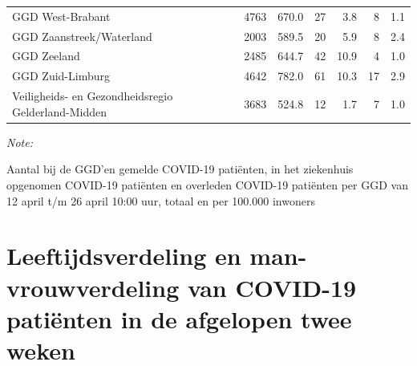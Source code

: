 \documentclass[
  english,
  man,floatsintext]{apa6}
\begin{document}
\begin{table}
\begin{threeparttable}
\begin{tabular}{lrrrrrr}
GGD West-Brabant & 4763 & 670.0 & 27 & 3.8 & 8 & 1.1\\
GGD Zaanstreek/Waterland & 2003 & 589.5 & 20 & 5.9 & 8 & 2.4\\
GGD Zeeland & 2485 & 644.7 & 42 & 10.9 & 4 & 1.0\\
GGD Zuid-Limburg & 4642 & 782.0 & 61 & 10.3 & 17 & 2.9\\
Veiligheids- en Gezondheidsregio Gelderland-Midden & 3683 & 524.8 & 12 & 1.7 & 7 & 1.0\\
\bottomrule
\end{tabular}
\begin{tablenotes}
\item \textit{Note: } 
\item Aantal bij de GGD’en gemelde COVID-19 patiënten, in het ziekenhuis opgenomen COVID-19 patiënten en overleden COVID-19 patiënten per GGD van 12 april t/m 26 april 10:00 uur, totaal en per 100.000 inwoners
\end{tablenotes}
\end{threeparttable}
\endgroup{}
\end{table}

\newpage

\hypertarget{leeftijdsverdeling-en-man-vrouwverdeling-van-covid-19-patiuxebnten-in-de-afgelopen-twee-weken}{%
\section{Leeftijdsverdeling en man-vrouwverdeling van COVID-19 patiënten in de afgelopen twee weken}\label{leeftijdsverdeling-en-man-vrouwverdeling-van-covid-19-patiuxebnten-in-de-afgelopen-twee-weken}}
\end{document}

